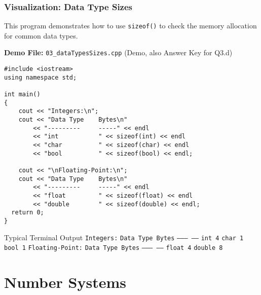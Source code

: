 \documentclass{beamer}
\begin{document}
\begin{frame}[fragile]
\frametitle{Visualization: Data Type Sizes}
This program demonstrates how to use \texttt{sizeof()} to check the memory allocation for common data types.

\textbf{Demo File:} \texttt{03\_dataTypesSizes.cpp} (Demo, also Answer Key for Q3.d)
\begin{verbatim}
#include <iostream>
using namespace std;

int main()
{
    cout << "Integers:\n";
    cout << "Data Type    Bytes\n"
        << "---------     -----" << endl
        << "int           " << sizeof(int) << endl
        << "char          " << sizeof(char) << endl
        << "bool          " << sizeof(bool) << endl;

    cout << "\nFloating-Point:\n";
    cout << "Data Type    Bytes\n"
        << "---------     -----" << endl
        << "float         " << sizeof(float) << endl
        << "double        " << sizeof(double) << endl;
  return 0;
}
\end{verbatim}
\pause
\begin{block}{Typical Terminal Output}
\texttt{Integers:} \newline
\texttt{Data Type    Bytes} \newline
\texttt{---------     -----} \newline
\texttt{int           4} \newline
\texttt{char          1} \newline
\texttt{bool          1} \newline
\newline
\texttt{Floating-Point:} \newline
\texttt{Data Type    Bytes} \newline
\texttt{---------     -----} \newline
\texttt{float         4} \newline
\texttt{double        8}
\end{block}
\end{frame}

\section{Number Systems}
\end{document}
